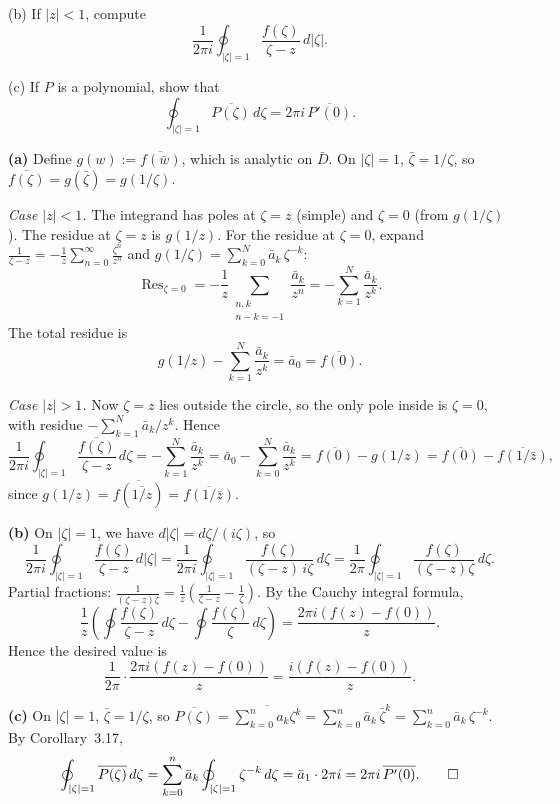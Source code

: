 \documentclass{article}
\begin{document}
(b) If $|z| < 1$, compute
\[
  \frac{1}{2\pi i}\oint_{|\zeta|=1}
  \frac{f(\zeta)}{\zeta - z}\,d|\zeta|.
\]

(c) If $P$ is a polynomial, show that
\[
  \oint_{|\zeta|=1} \overline{P(\zeta)}\,d\zeta
  = 2\pi i\,\overline{P'(0)}.
\]

\begin{solution}
  \textbf{(a)}\;
  Define $g(w) := \overline{f(\bar{w})}$, which is analytic on
  $\bar{D}$.
  On $|\zeta|=1$, $\bar\zeta = 1/\zeta$, so
  $\overline{f(\zeta)} = g(\bar\zeta) = g(1/\zeta)$.

  \smallskip

  \textit{Case $|z|<1$.}\;
  The integrand has poles at $\zeta = z$ (simple) and
  $\zeta = 0$ (from $g(1/\zeta)$).
  The residue at $\zeta = z$ is $g(1/z)$.
  For the residue at $\zeta = 0$, expand
  $\frac{1}{\zeta-z} = -\frac{1}{z}\sum_{n=0}^{\infty}
  \frac{\zeta^n}{z^n}$ and $g(1/\zeta)
  = \sum_{k=0}^{N}\bar{a}_k\,\zeta^{-k}$:
  \[
    \operatorname{Res}_{\zeta=0}
    = -\frac{1}{z}\sum_{\substack{n,k\\ n-k=-1}}
    \frac{\bar{a}_k}{z^n}
    = -\sum_{k=1}^{N}\frac{\bar{a}_k}{z^k}.
  \]
  The total residue is
  \[
    g(1/z) - \sum_{k=1}^{N}\frac{\bar{a}_k}{z^k}
    = \bar{a}_0 = \overline{f(0)}.
  \]

  \smallskip

  \textit{Case $|z|>1$.}\;
  Now $\zeta = z$ lies outside the circle, so the only pole
  inside is $\zeta = 0$, with residue
  $-\sum_{k=1}^{N}\bar{a}_k/z^k$.
  Hence
  \[
    \frac{1}{2\pi i}\oint_{|\zeta|=1}
    \frac{\overline{f(\zeta)}}{\zeta-z}\,d\zeta
    = -\sum_{k=1}^{N}\frac{\bar{a}_k}{z^k}
    = \bar{a}_0 - \sum_{k=0}^{N}\frac{\bar{a}_k}{z^k}
    = \overline{f(0)} - g(1/z)
    = \overline{f(0)} - \overline{f(1/\bar{z})},
  \]
  since $g(1/z) = \overline{f(\overline{1/z})}
  = \overline{f(1/\bar{z})}$.

  \medskip

  \textbf{(b)}\;
  On $|\zeta|=1$, we have $d|\zeta| = d\zeta/(i\zeta)$, so
  \[
    \frac{1}{2\pi i}\oint_{|\zeta|=1}
    \frac{f(\zeta)}{\zeta-z}\,d|\zeta|
    = \frac{1}{2\pi i}\oint_{|\zeta|=1}
    \frac{f(\zeta)}{(\zeta-z)\,i\zeta}\,d\zeta
    = \frac{1}{2\pi}\oint_{|\zeta|=1}
    \frac{f(\zeta)}{(\zeta-z)\zeta}\,d\zeta.
  \]
  Partial fractions:
  $\frac{1}{(\zeta-z)\zeta}
  = \frac{1}{z}\!\left(\frac{1}{\zeta-z}-\frac{1}{\zeta}\right)$.
  By the Cauchy integral formula,
  \[
    \frac{1}{z}\!\left(
      \oint\frac{f(\zeta)}{\zeta-z}\,d\zeta
      -\oint\frac{f(\zeta)}{\zeta}\,d\zeta
    \right)
    = \frac{2\pi i(f(z)-f(0))}{z}.
  \]
  Hence the desired value is
  \[
    \frac{1}{2\pi}\cdot\frac{2\pi i(f(z)-f(0))}{z}
    = \frac{i(f(z)-f(0))}{z}.
  \]

  \medskip

  \textbf{(c)}\;
  On $|\zeta|=1$, $\bar\zeta = 1/\zeta$, so
  $\overline{P(\zeta)} = \overline{\sum_{k=0}^{n}a_k\zeta^k}
  = \sum_{k=0}^{n}\bar{a}_k\,\bar\zeta^k
  = \sum_{k=0}^{n}\bar{a}_k\,\zeta^{-k}$.
  By Corollary~3.17,
  \[
    \oint_{|\zeta|=1}\overline{P(\zeta)}\,d\zeta
    = \sum_{k=0}^{n}\bar{a}_k\oint_{|\zeta|=1}\zeta^{-k}\,d\zeta
    = \bar{a}_1\cdot 2\pi i
    = 2\pi i\,\overline{P'(0)}.\qedhere
  \]
\end{solution}
\end{document}
